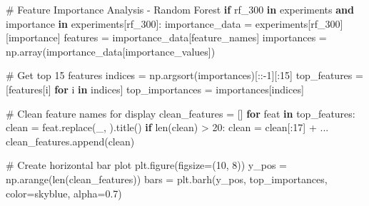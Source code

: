 \documentclass[
  letterpaper,
  DIV=11,
  numbers=noendperiod]{scrartcl}
\newenvironment{Shaded}{\begin{snugshade}}{\end{snugshade}}
\newcommand{\BuiltInTok}[1]{\textcolor[rgb]{0.00,0.23,0.31}{#1}}
\newcommand{\CommentTok}[1]{\textcolor[rgb]{0.37,0.37,0.37}{#1}}
\newcommand{\ControlFlowTok}[1]{\textcolor[rgb]{0.00,0.23,0.31}{\textbf{#1}}}
\newcommand{\DecValTok}[1]{\textcolor[rgb]{0.68,0.00,0.00}{#1}}
\newcommand{\FloatTok}[1]{\textcolor[rgb]{0.68,0.00,0.00}{#1}}
\newcommand{\KeywordTok}[1]{\textcolor[rgb]{0.00,0.23,0.31}{\textbf{#1}}}
\newcommand{\NormalTok}[1]{\textcolor[rgb]{0.00,0.23,0.31}{#1}}
\newcommand{\OperatorTok}[1]{\textcolor[rgb]{0.37,0.37,0.37}{#1}}
\newcommand{\StringTok}[1]{\textcolor[rgb]{0.13,0.47,0.30}{#1}}
\renewenvironment{Shaded}{%
  \begin{tcolorbox}[%
    enhanced,%
    colback=codebg,%
    colframe=codebg,%
    borderline west={3pt}{0pt}{sectionblue},%
    fontupper=\small\ttfamily,%
    boxrule=0pt,%
    arc=0pt,%
    boxsep=5pt,%
    left=2mm,%
    right=2mm,%
    top=2mm,%
    bottom=2mm%
  ]%
}{%
  \end{tcolorbox}%
}
\begin{document}
\begin{Shaded}
\begin{Highlighting}[]
\CommentTok{\# Feature Importance Analysis {-} Random Forest}
\ControlFlowTok{if} \StringTok{\textquotesingle{}rf\_300\textquotesingle{}} \KeywordTok{in}\NormalTok{ experiments }\KeywordTok{and} \StringTok{\textquotesingle{}importance\textquotesingle{}} \KeywordTok{in}\NormalTok{ experiments[}\StringTok{\textquotesingle{}rf\_300\textquotesingle{}}\NormalTok{]:}
\NormalTok{    importance\_data }\OperatorTok{=}\NormalTok{ experiments[}\StringTok{\textquotesingle{}rf\_300\textquotesingle{}}\NormalTok{][}\StringTok{\textquotesingle{}importance\textquotesingle{}}\NormalTok{]}
\NormalTok{    features }\OperatorTok{=}\NormalTok{ importance\_data[}\StringTok{\textquotesingle{}feature\_names\textquotesingle{}}\NormalTok{]}
\NormalTok{    importances }\OperatorTok{=}\NormalTok{ np.array(importance\_data[}\StringTok{\textquotesingle{}importance\_values\textquotesingle{}}\NormalTok{])}

    \CommentTok{\# Get top 15 features}
\NormalTok{    indices }\OperatorTok{=}\NormalTok{ np.argsort(importances)[::}\OperatorTok{{-}}\DecValTok{1}\NormalTok{][:}\DecValTok{15}\NormalTok{]}
\NormalTok{    top\_features }\OperatorTok{=}\NormalTok{ [features[i] }\ControlFlowTok{for}\NormalTok{ i }\KeywordTok{in}\NormalTok{ indices]}
\NormalTok{    top\_importances }\OperatorTok{=}\NormalTok{ importances[indices]}

    \CommentTok{\# Clean feature names for display}
\NormalTok{    clean\_features }\OperatorTok{=}\NormalTok{ []}
    \ControlFlowTok{for}\NormalTok{ feat }\KeywordTok{in}\NormalTok{ top\_features:}
\NormalTok{        clean }\OperatorTok{=}\NormalTok{ feat.replace(}\StringTok{\textquotesingle{}\_\textquotesingle{}}\NormalTok{, }\StringTok{\textquotesingle{} \textquotesingle{}}\NormalTok{).title()}
        \ControlFlowTok{if} \BuiltInTok{len}\NormalTok{(clean) }\OperatorTok{\textgreater{}} \DecValTok{20}\NormalTok{:}
\NormalTok{            clean }\OperatorTok{=}\NormalTok{ clean[:}\DecValTok{17}\NormalTok{] }\OperatorTok{+} \StringTok{\textquotesingle{}...\textquotesingle{}}
\NormalTok{        clean\_features.append(clean)}

    \CommentTok{\# Create horizontal bar plot}
\NormalTok{    plt.figure(figsize}\OperatorTok{=}\NormalTok{(}\DecValTok{10}\NormalTok{, }\DecValTok{8}\NormalTok{))}
\NormalTok{    y\_pos }\OperatorTok{=}\NormalTok{ np.arange(}\BuiltInTok{len}\NormalTok{(clean\_features))}
\NormalTok{    bars }\OperatorTok{=}\NormalTok{ plt.barh(y\_pos, top\_importances, color}\OperatorTok{=}\StringTok{\textquotesingle{}skyblue\textquotesingle{}}\NormalTok{, alpha}\OperatorTok{=}\FloatTok{0.7}\NormalTok{)}


\end{Highlighting}
\end{Shaded}
\end{document}
